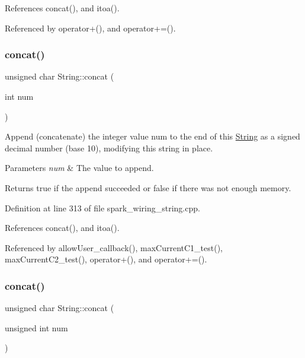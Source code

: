 References concat(), and itoa().



Referenced by operator+(), and operator+=().

\mbox{\label{class_string_a6d437a7312b591848b5457705fee5549}} 
\subsubsection{\texorpdfstring{concat()}{concat()}\hspace{0.1cm}{\footnotesize\ttfamily [6/12]}}
{\footnotesize\ttfamily unsigned char String\+::concat (\begin{DoxyParamCaption}\item[{int}]{num }\end{DoxyParamCaption})}



Append (concatenate) the integer value num to the end of this \hyperlink{class_string}{String} as a signed decimal number (base 10), modifying this string in place. 


\begin{DoxyParams}{Parameters}
{\em num} & The value to append.\\
\hline
\end{DoxyParams}
\begin{DoxyReturn}{Returns}
true if the append succeeded or false if there was not enough memory. 
\end{DoxyReturn}


Definition at line 313 of file spark\+\_\+wiring\+\_\+string.\+cpp.



References concat(), and itoa().



Referenced by allow\+User\+\_\+callback(), max\+Current\+C1\+\_\+test(), max\+Current\+C2\+\_\+test(), operator+(), and operator+=().

\mbox{\label{class_string_af9c20f944d8a4687808017388047d155}} 
\subsubsection{\texorpdfstring{concat()}{concat()}\hspace{0.1cm}{\footnotesize\ttfamily [7/12]}}
{\footnotesize\ttfamily unsigned char String\+::concat (\begin{DoxyParamCaption}\item[{unsigned int}]{num }\end{DoxyParamCaption})}



